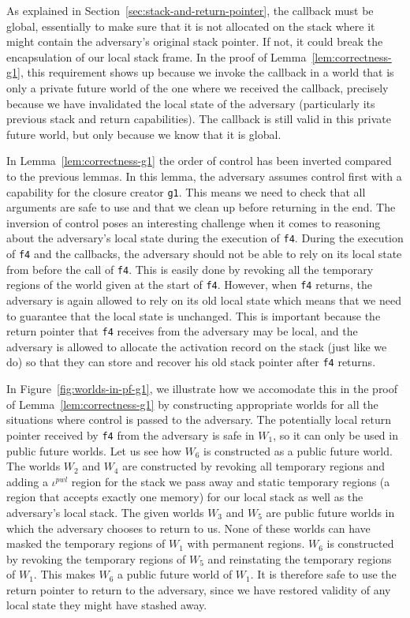 \documentclass[compsoc,conference,letterpaper,fleqn]{IEEEtran}
\newcommand{\var}[1]{\mathit{#1}}
\newcommand{\pwl}{\var{pwl}}
\begin{document}
As explained in Section~\ref{sec:stack-and-return-pointer}, the callback must be
global, essentially to make sure that it is not allocated on the stack where it
might contain the adversary's original stack pointer. If not, it could break the
encapsulation of our local stack frame. In the proof of
Lemma~\ref{lem:correctness-g1}, this requirement shows up because we invoke the
callback in a world that is only a private future world of the one where we
received the callback, precisely because we have invalidated the local state of
the adversary (particularly its previous stack and return capabilities). The
callback is still valid in this private future world, but only because we know
that it is global.

In Lemma~\ref{lem:correctness-g1} the order of control has been inverted
compared to the previous lemmas. In this lemma, the adversary assumes control
first with a capability for the closure creator \texttt{\footnotesize{g1}}. This means we need
to check that all arguments are safe to use and that we clean up before
returning in the end. The inversion of control poses an interesting challenge
when it comes to reasoning about the adversary's local state during the
execution of \texttt{\footnotesize{f4}}. During the execution of \texttt{\footnotesize{f4}} and the callbacks,
the adversary should not be able to rely on its local state from before the call
of \texttt{\footnotesize{f4}}. This is easily done by revoking all the temporary regions of the
world given at the start of \texttt{\footnotesize{f4}}. However, when \texttt{\footnotesize{f4}} returns, the
adversary is again allowed to rely on its old local state which means that we
need to guarantee that the local state is unchanged. This is important because
the return pointer that \texttt{\footnotesize{f4}} receives from the adversary may be local,
and the adversary is allowed to allocate the activation record on the stack
(just like we do) so that they can store and recover his old stack pointer after
\texttt{\footnotesize{f4}} returns.

In Figure~\ref{fig:worlds-in-pf-g1}, we illustrate how we accomodate this in the
proof of Lemma~\ref{lem:correctness-g1} by constructing appropriate worlds for
all the situations where control is passed to the adversary. The potentially
local return pointer received by \texttt{\footnotesize{f4}} from the adversary is safe in
$W_1$, so it can only be used in public future worlds. Let us see how $W_6$ is
constructed as a public future world. The worlds $W_2$ and $W_4$ are constructed
by revoking all temporary regions and adding a $\iota^\pwl$ region for the stack
we pass away and static temporary regions (a region that accepts exactly one
memory) for our local stack as well as the adversary's local stack. The given
worlds $W_3$ and $W_5$ are public future worlds in which the adversary chooses
to return to us. None of these worlds can have masked the temporary regions of
$W_1$ with permanent regions. $W_6$ is constructed by revoking the temporary
regions of $W_5$ and reinstating the temporary regions of $W_1$. This makes
$W_6$ a public future world of $W_1$. It is therefore safe to use the return
pointer to return to the adversary, since we have restored validity of any local
state they might have stashed away.
\end{document}
